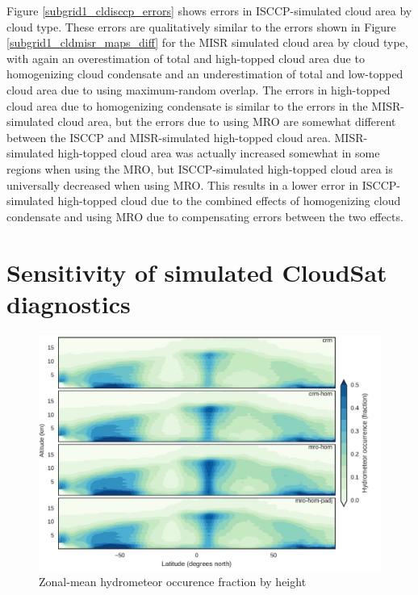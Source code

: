 Figure \ref{subgrid1_cldisccp_errors} shows errors in ISCCP-simulated cloud area by cloud type. These errors are qualitatively similar to the errors shown in Figure \ref{subgrid1_cldmisr_maps_diff} for the MISR simulated cloud area by cloud type, with again an overestimation of total and high-topped cloud area due to homogenizing cloud condensate and an underestimation of total and low-topped cloud area due to using maximum-random overlap. The errors in high-topped cloud area due to homogenizing condensate is similar to the errors in the MISR-simulated cloud area, but the errors due to using MRO are somewhat different between the ISCCP and MISR-simulated high-topped cloud area. MISR-simulated high-topped cloud area was actually increased somewhat in some regions when using the MRO, but ISCCP-simulated high-topped cloud area is universally decreased when using MRO. This results in a lower error in ISCCP-simulated high-topped cloud due to the combined effects of homogenizing cloud condensate and using MRO due to compensating errors between the two effects.


\section{Sensitivity of simulated CloudSat diagnostics}

\begin{figure}
\centering
\includegraphics[width=\columnwidth]{graphics/subgrid1_hfba_zonal.pdf}
\caption{Zonal-mean hydrometeor occurence fraction by height}
\label{subgrid1_hfba_zonal}
\end{figure}

